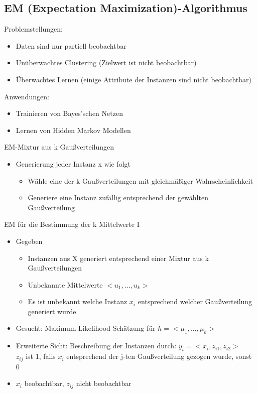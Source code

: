 \documentclass[paper=a4, fontsize=11pt]{scrartcl} %
\numberwithin{equation}{section} %
\numberwithin{figure}{section} %
\numberwithin{table}{section} %
\begin{document}
\subsection{EM (Expectation Maximization)-Algorithmus}

Problemstellungen:
\begin{itemize}
\item Daten sind nur partiell beobachtbar
\item Unüberwachtes Clustering (Zielwert ist nicht beobachtbar)
\item Überwachtes Lernen (einige Attribute der Instanzen sind nicht beobachtbar)
\end{itemize}

Anwendungen:
\begin{itemize}
\item Trainieren von Bayes'schen Netzen
\item Lernen von Hidden Markov Modellen
\end{itemize}

EM-Mixtur aus k Gaußverteilungen
\begin{itemize}
\item Generierung jeder Instanz x wie folgt
\begin{itemize}
\item Wähle eine der k Gaußverteilungen mit gleichmäßiger Wahrscheinlichkeit
\item Generiere eine Instanz zufällig entsprechend der gewählten Gaußverteilung
\end{itemize}
\end{itemize}

EM für die Bestimmung der k Mittelwerte I
\begin{itemize}
\item Gegeben
\begin{itemize}
\item Instanzen aus X generiert entsprechend einer Mixtur aus k Gaußverteilungen
\item Unbekannte Mittelwerte $<u_1,...,u_k>$
\item Es ist unbekannt welche Instanz $x_i$ entsprechend welcher Gaußverteilung generiert wurde
\end{itemize}
\item Gesucht: Maximum Likelihood Schätzung für $h = <\mu_1,...,\mu_k>$
\item Erweiterte Sicht: Beschreibung der Instanzen durch: $y_i = <x_i, z_{i1}, z_{i2}>$\\ 
$z_{ij}$ ist 1, falls $x_i$ entsprechend der j-ten Gaußverteilung gezogen wurde, sonst 0
\item $x_i$ beobachtbar, $z_{ij}$ nicht beobachtbar
\end{itemize}
\end{document}
